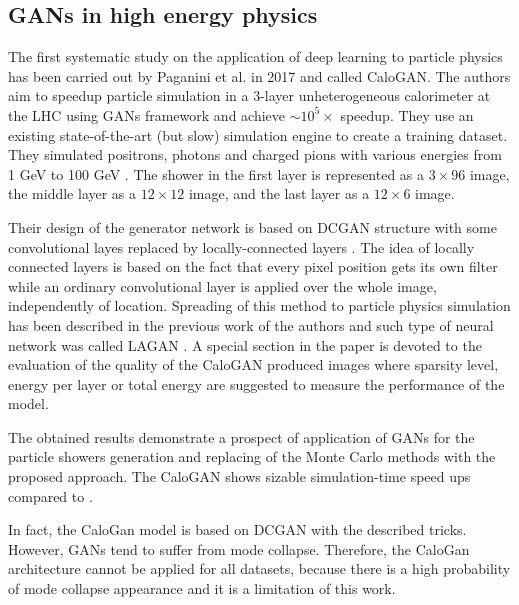 \subsection{GANs in high energy physics}
The first  systematic study on the application of deep learning to particle physics has been carried out by Paganini et al. in 2017 \cite{paganini2017calogan} and called CaloGAN. The authors aim to speedup particle simulation in a 3-layer unheterogeneous calorimeter at the LHC using GANs framework and achieve $\sim 10^5 \times$ speedup. They use an existing state-of-the-art (but slow) simulation engine \geant to create a training dataset. They simulated positrons, photons and charged pions with various energies from 1 GeV to 100 GeV . The shower in the first layer is represented as a $3 \times 96$ image, the middle layer as a $12 \times 12$ image, and the last layer as a $12 \times 6$ image. 

Their design of the generator network is based on DCGAN structure \cite{radford2015unsupervised} with some convolutional layes replaced by locally-connected layers \cite{taigman2014deepface}. The idea of locally connected layers is based on the fact that every pixel position gets its own filter while an ordinary convolutional layer is applied over the whole image, independently of location. Spreading of this method to particle physics simulation has been described in the previous work of the authors and such type of neural network was called LAGAN \cite{de2017learning}. A special section in the paper is devoted to the evaluation of the quality of the CaloGAN produced images where  sparsity level,  energy per layer or total energy are suggested to measure the performance of the model. 

The obtained results demonstrate a prospect of application of GANs for the particle showers generation and replacing of the Monte Carlo methods with the proposed approach. The CaloGAN shows sizable simulation-time speed ups compared to \geant. 

In fact, the CaloGan model is based on DCGAN with the described tricks. However, GANs tend to suffer from mode collapse. Therefore, the CaloGan architecture cannot be applied for all datasets, because there is a high probability of mode collapse appearance and it is a limitation of this work.
